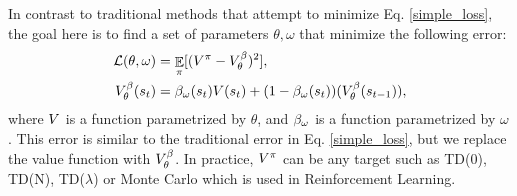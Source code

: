 In contrast to traditional methods that attempt to minimize Eq. \ref{simple_loss}, the goal here is to find a set of parameters $\theta,\omega$ that minimize the following error:
\begin{equation}
\begin{split}
    \mathcal{L}(\theta,\omega) &= \mathop{\mathbb{E}}_{\pi} [(V^{\pi} - V^{\beta}_{\theta})^2], \\
	 V^{\beta}_{\theta}(s_t) &= \beta_{\omega}(s_t) V(s_t) + (1 - \beta_{\omega}(s_t)) (V^{\beta}_{\theta}(s_{t-1})),
\end{split}
\label{loss_beta}
\end{equation}
where $V$ is a function parametrized by $\theta$, and $\beta_{\omega}$ is a function parametrized by $\omega$.
This error is similar to the traditional error in Eq. \ref{simple_loss}, but we replace the value function with $V^{\beta}_{\theta}$. In practice, $V^{\pi}$ can be any target such as TD(0), TD(N), TD($\lambda$) or Monte Carlo \cite{sutton1998reinforcement} which is used in Reinforcement Learning.


